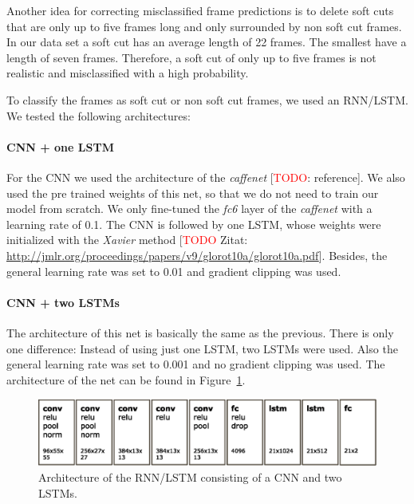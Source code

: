 Another idea for correcting misclassified frame predictions is to delete soft cuts that are only up to five frames long and only surrounded by non soft cut frames.
In our data set a soft cut has an average length of 22 frames.
The smallest have a length of seven frames.
Therefore, a soft cut of only up to five frames is not realistic and misclassified with a high probability.

To classify the frames as soft cut or non soft cut frames, we used an RNN/LSTM.
We tested the following architectures:

\paragraph{CNN + one LSTM}
For the CNN we used the architecture of the \textit{caffenet} [\textcolor{red}{TODO}: reference].
We also used the pre trained weights of this net, so that we do not need to train our model from scratch.
We only fine-tuned the \textit{fc6} layer of the \textit{caffenet} with a learning rate of 0.1.
The CNN is followed by one LSTM, whose weights were initialized with the \textit{Xavier} method [\textcolor{red}{TODO} Zitat: \url{http://jmlr.org/proceedings/papers/v9/glorot10a/glorot10a.pdf}].
Besides, the general learning rate was set to 0.01 and gradient clipping was used.

\paragraph{CNN + two LSTMs}
The architecture of this net is basically the same as the previous.
There is only one difference: Instead of using just one LSTM, two LSTMs were used.
Also the general learning rate was set to 0.001 and no gradient clipping was used.
The architecture of the net can be found in Figure~\ref{fig:net_architecture}.
\begin{figure}[!htb]
	\centering
	\includegraphics[scale=.5]{images/net_architecture.eps}
	\caption{Architecture of the RNN/LSTM consisting of a CNN and two LSTMs.}
	\label{fig:net_architecture}
\end{figure}


